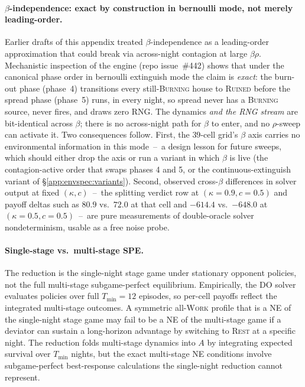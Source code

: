 \documentclass{anvil-paper}
\begin{document}
\paragraph{$\beta$-independence: exact by construction in bernoulli
mode, not merely leading-order.}
Earlier drafts of this appendix treated $\beta$-independence as a
leading-order approximation that could break via across-night
contagion at large $\beta\rho$. Mechanistic inspection of the engine
(repo issue~\#442) shows that under the canonical phase order in
bernoulli extinguish mode the claim is \emph{exact}: the burn-out
phase (phase~4) transitions every still-\textsc{Burning} house to
\textsc{Ruined} before the spread phase (phase~5) runs, in every
night, so spread never has a \textsc{Burning} source, never fires,
and draws zero RNG. The dynamics \emph{and the RNG stream} are
bit-identical across $\beta$; there is no across-night path for
$\beta$ to enter, and no $\rho$-sweep can activate it. Two
consequences follow. First, the $39$-cell grid's $\beta$ axis carries
no environmental information in this mode~--~a design lesson for
future sweeps, which should either drop the axis or run a variant in
which $\beta$ is live (the contagion-active order that swaps phases
4 and 5, or the continuous-extinguish variant of
\S\ref{app:envspec:variants}). Second, observed cross-$\beta$
differences in solver output at fixed $(\kappa,c)$~--~the splitting
verdict row at $(\kappa{=}0.9,c{=}0.5)$ and payoff deltas such as
$80.9$ vs.\ $72.0$ at that cell and $-614.4$ vs.\ $-648.0$ at
$(\kappa{=}0.5,c{=}0.5)$~--~are pure measurements of double-oracle
solver nondeterminism, usable as a free noise probe.

\paragraph{Single-stage vs.\ multi-stage SPE.}
The reduction is the single-night stage game under stationary opponent
policies, not the full multi-stage subgame-perfect equilibrium.
Empirically, the DO solver evaluates policies over full
$T_{\min}{=}12$ episodes, so per-cell payoffs reflect the integrated
multi-stage outcomes. A symmetric all-\textsc{Work} profile that is a
NE of the single-night stage game may fail to be a NE of the
multi-stage game if a deviator can sustain a long-horizon advantage by
switching to \textsc{Rest} at a specific night. The reduction folds
multi-stage dynamics into $A$ by integrating expected survival over
$T_{\min}$ nights, but the exact multi-stage NE conditions involve
subgame-perfect best-response calculations the single-night reduction
cannot represent.
\end{document}
